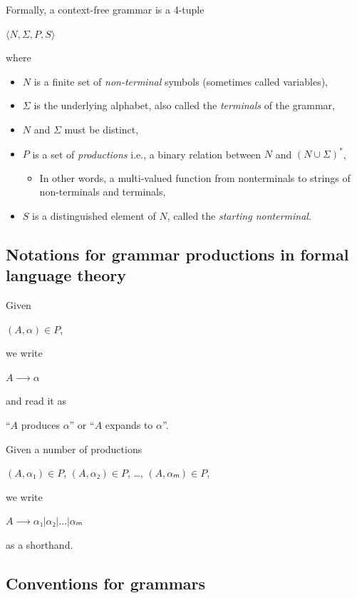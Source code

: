 \documentclass[11pt]{article}
\theoremstyle{definition}
\begin{document}
Formally, a context-free grammar is a 4-tuple
\begin{center}
\(⟨N, Σ, P, S⟩\)
\end{center}
where
\begin{itemize}
\item \(N\) is a finite set of \emph{non-terminal} symbols
(sometimes called variables),
\item \(Σ\) is the underlying alphabet,
also called the \emph{terminals} of the grammar,
\item \(N\) and \(Σ\) must be distinct,
\item \(P\) is a set of \emph{productions} i.e.,
a binary relation between \(N\) and \((N ∪ Σ)^{*}\),
\begin{itemize}
\item In other words, a multi-valued function from
nonterminals to strings of non-terminals and terminals,
\end{itemize}
\item \(S\) is a distinguished element of \(N\), called the \emph{starting nonterminal}.
\end{itemize}

\subsection{Notations for grammar productions in formal language theory}
\label{sec:orgbdaa192}

Given
\begin{center}
\((A, α) ∈ P\),
\end{center}
we write
\begin{center}
\(A ⟶ α\)
\end{center}
and read it as
\begin{center}
“\(A\) produces \(α\)” or “\(A\) expands to \(α\)”.
\end{center}

Given a number of
productions
\begin{center}
\((A, α₁) ∈ P\), \((A, α₂) ∈ P\), …, \((A, αₘ) ∈ P\),
\end{center}
we write
\begin{center}
\(A ⟶ α₁ | α₂ | … | αₘ\)
\end{center}
as a shorthand.

\subsection{Conventions for grammars}
\label{sec:orgb576534}
\end{document}
